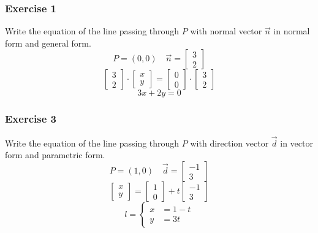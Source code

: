 \documentclass[letterpaper, 12pt]{math}
\begin{document}
\subsubsection*{Exercise 1}
Write the equation of the line passing through \( P \) with normal vector
\( \vec{n} \) in normal form and general form.
\[ P = (0,0) \quad \vec{n} = \begin{bmatrix}3 \\ 2\end{bmatrix} \]
\[ \begin{bmatrix}3 \\ 2\end{bmatrix}\cdot\begin{bmatrix}x \\ y\end{bmatrix} =
  \begin{bmatrix}0 \\ 0\end{bmatrix}\cdot\begin{bmatrix}3 \\ 2\end{bmatrix} \]
\[ 3x+2y = 0 \]

\subsubsection*{Exercise 3}
Write the equation of the line passing through \( P \) with direction vector
\( \vec{d} \) in vector form and parametric form.
\[ P = (1,0) \quad \vec{d} = \begin{bmatrix}-1 \\ 3\end{bmatrix} \]
\[ \begin{bmatrix}x \\ y\end{bmatrix} =
  \begin{bmatrix}1 \\ 0\end{bmatrix}+t\begin{bmatrix}-1 \\ 3\end{bmatrix} \]
\[ l = \begin{cases}
  x &= 1-t \\
  y &= 3t
\end{cases} \]
\end{document}
